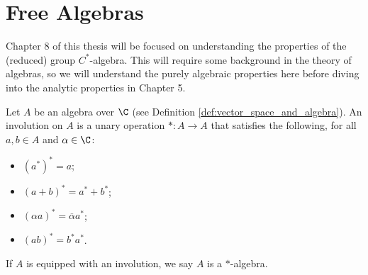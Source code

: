 \section{Free Algebras}%
Chapter 8 of this thesis will be focused on understanding the properties of the (reduced) group $C^{\ast}$-algebra. This will require some background in the theory of algebras, so we will understand the purely algebraic properties here before diving into the analytic properties in Chapter 5.
\begin{definition}
  Let $A$ be an algebra over $\C$ (see Definition \ref{def:vector_space_and_algebra}). An involution on $A$ is a unary operation $\ast\colon A\rightarrow A$ that satisfies the following, for all $a,b\in A$ and $\alpha\in\C$:
  \begin{itemize}
    \item $\left(a^{\ast}\right)^{\ast} = a$;
    \item $\left(a+b\right)^{\ast} = a^{\ast} + b^{\ast}$;
    \item $\left(\alpha a\right)^{\ast} = \overline{\alpha} a^{\ast}$;
    \item $\left(ab\right)^{\ast} = b^{\ast}a^{\ast}$.
  \end{itemize}
  If $A$ is equipped with an involution, we say $A$ is a $\ast$-algebra.
\end{definition}
